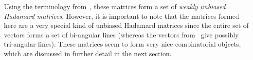 Using the terminology from~\cite{much10}, these matrices form a set of {\it weakly unbiased Hadamard matrices}. However, it is important to note that the matrices formed here are a very special kind of unbiased Hadamard matrices since the entire set of vectors forms a set of bi-angular lines (whereas the vectors from~\cite{much10} give possibly tri-angular lines). These matrices seem to form very nice combinatorial objects, which are discussed in further detail in the next section.
